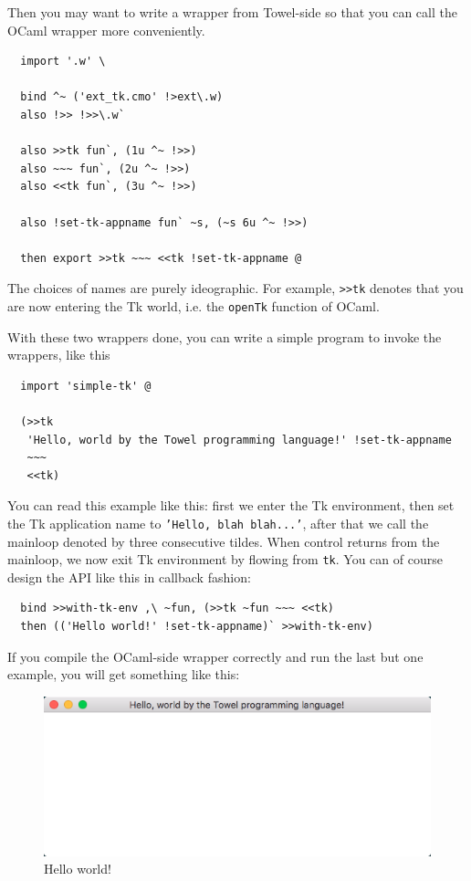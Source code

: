 \documentclass{report}
\begin{document}
Then you may want to write a wrapper from Towel-side so that you can call the OCaml wrapper more conveniently.

\begin{mdframed}[style=cl]
\begin{verbatim}
  import '.w' \

  bind ^~ ('ext_tk.cmo' !>ext\.w)
  also !>> !>>\.w`

  also >>tk fun`, (1u ^~ !>>)
  also ~~~ fun`, (2u ^~ !>>)
  also <<tk fun`, (3u ^~ !>>)

  also !set-tk-appname fun` ~s, (~s 6u ^~ !>>)

  then export >>tk ~~~ <<tk !set-tk-appname @
\end{verbatim}
\end{mdframed}

The choices of names are purely ideographic. For example, \texttt{>>tk} denotes that you are now entering the Tk world, i.e. the \texttt{openTk} function of OCaml.

With these two wrappers done, you can write a simple program to invoke the wrappers, like this

\begin{mdframed}[style=example]
\begin{verbatim}
  import 'simple-tk' @

  (>>tk
   'Hello, world by the Towel programming language!' !set-tk-appname
   ~~~
   <<tk)
\end{verbatim}
\end{mdframed}

You can read this example like this: first we enter the Tk environment, then set the Tk application name to \texttt{'Hello, blah blah...'}, after that we call the mainloop denoted by three consecutive tildes. When control returns from the mainloop, we now exit Tk environment by flowing from \texttt{tk}. You can of course design the API like this in callback fashion:

\begin{mdframed}[style=example]
\begin{verbatim}
  bind >>with-tk-env ,\ ~fun, (>>tk ~fun ~~~ <<tk)
  then (('Hello world!' !set-tk-appname)` >>with-tk-env)
\end{verbatim}
\end{mdframed}

If you compile the OCaml-side wrapper correctly and run the last but one example, you will get something like this:

\begin{figure}[H]
  \centering
  \includegraphics[scale=0.75]{fig-gui.png}
  \caption{Hello world!}
  \label{fig:gui}
\end{figure}
\end{document}
